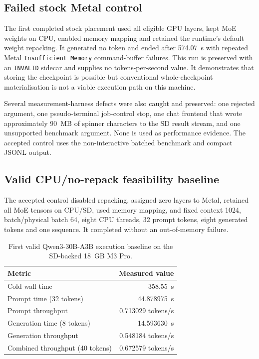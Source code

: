 \subsection{Failed stock Metal control}

The first completed stock placement used all eligible GPU layers, kept MoE
weights on CPU, enabled memory mapping and retained the runtime's default weight
repacking.  It generated no token and ended after 574.07~s with repeated Metal
\texttt{Insufficient Memory} command-buffer failures.  This run is preserved
with an \texttt{INVALID} sidecar and supplies no tokens-per-second value.  It
demonstrates that storing the checkpoint is possible but conventional
whole-checkpoint materialisation is not a viable execution path on this machine.

Several measurement-harness defects were also caught and preserved: one rejected
argument, one pseudo-terminal job-control stop, one chat frontend that wrote
approximately 90~MB of spinner characters to the SD result stream, and one
unsupported benchmark argument.  None is used as performance evidence.  The
accepted control uses the non-interactive batched benchmark and compact JSONL
output.

\subsection{Valid CPU/no-repack feasibility baseline}

The accepted control disabled repacking, assigned zero layers to Metal, retained
all MoE tensors on CPU/SD, used memory mapping, and fixed context 1024,
batch/physical batch 64, eight CPU threads, 32 prompt tokens, eight generated
tokens and one sequence.  It completed without an out-of-memory failure.

\begin{table}[ht]
\centering
\begin{tabular}{lr}
\toprule
Metric & Measured value \\
\midrule
Cold wall time & 358.55~s \\
Prompt time (32 tokens) & 44.878975~s \\
Prompt throughput & 0.713029 tokens/s \\
Generation time (8 tokens) & 14.593630~s \\
Generation throughput & 0.548184 tokens/s \\
Combined throughput (40 tokens) & 0.672579 tokens/s \\
\bottomrule
\end{tabular}
\caption{First valid Qwen3-30B-A3B execution baseline on the SD-backed 18~GB M3 Pro.}
\end{table}

